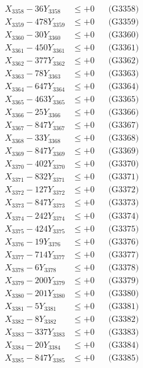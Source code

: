 \documentclass[a4paper,10pt]{article}
\begin{document}
{\begin{align}
X_{3358} - 36Y_{3358} &\leq +0 && \text{(G3358)} \\
X_{3359} - 478Y_{3359} &\leq +0 && \text{(G3359)} \\
X_{3360} - 30Y_{3360} &\leq +0 && \text{(G3360)} \\
\allowbreak
X_{3361} - 450Y_{3361} &\leq +0 && \text{(G3361)} \\
X_{3362} - 377Y_{3362} &\leq +0 && \text{(G3362)} \\
X_{3363} - 78Y_{3363} &\leq +0 && \text{(G3363)} \\
X_{3364} - 647Y_{3364} &\leq +0 && \text{(G3364)} \\
X_{3365} - 463Y_{3365} &\leq +0 && \text{(G3365)} \\
X_{3366} - 25Y_{3366} &\leq +0 && \text{(G3366)} \\
X_{3367} - 847Y_{3367} &\leq +0 && \text{(G3367)} \\
X_{3368} - 33Y_{3368} &\leq +0 && \text{(G3368)} \\
X_{3369} - 847Y_{3369} &\leq +0 && \text{(G3369)} \\
X_{3370} - 402Y_{3370} &\leq +0 && \text{(G3370)} \\
\allowbreak
X_{3371} - 832Y_{3371} &\leq +0 && \text{(G3371)} \\
X_{3372} - 127Y_{3372} &\leq +0 && \text{(G3372)} \\
X_{3373} - 847Y_{3373} &\leq +0 && \text{(G3373)} \\
X_{3374} - 242Y_{3374} &\leq +0 && \text{(G3374)} \\
X_{3375} - 424Y_{3375} &\leq +0 && \text{(G3375)} \\
X_{3376} - 19Y_{3376} &\leq +0 && \text{(G3376)} \\
X_{3377} - 714Y_{3377} &\leq +0 && \text{(G3377)} \\
X_{3378} - 6Y_{3378} &\leq +0 && \text{(G3378)} \\
X_{3379} - 200Y_{3379} &\leq +0 && \text{(G3379)} \\
X_{3380} - 201Y_{3380} &\leq +0 && \text{(G3380)} \\
\allowbreak
X_{3381} - 5Y_{3381} &\leq +0 && \text{(G3381)} \\
X_{3382} - 8Y_{3382} &\leq +0 && \text{(G3382)} \\
X_{3383} - 337Y_{3383} &\leq +0 && \text{(G3383)} \\
X_{3384} - 20Y_{3384} &\leq +0 && \text{(G3384)} \\
X_{3385} - 847Y_{3385} &\leq +0 && \text{(G3385)} \\

\end{align}}
\end{document}
